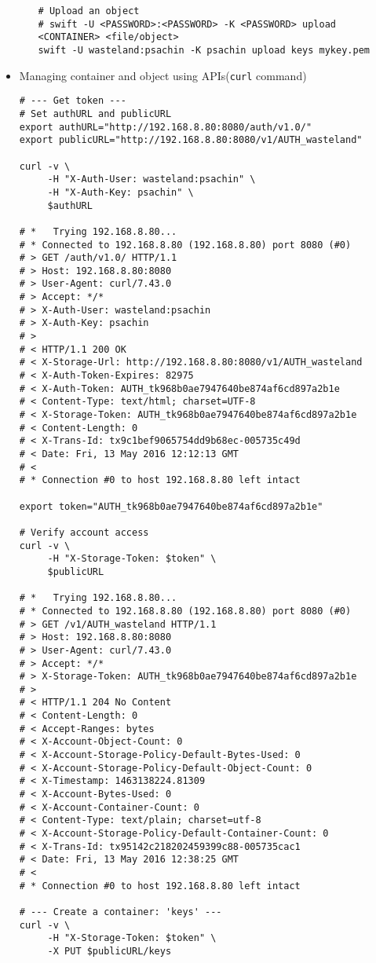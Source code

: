 \documentclass{article}
\begin{document}
\begin{itemize}
\begin{itemize}
\begin{verbatim}
# Upload an object
# swift -U <PASSWORD>:<PASSWORD> -K <PASSWORD> upload <CONTAINER> <file/object>
swift -U wasteland:psachin -K psachin upload keys mykey.pem
\end{verbatim}
\end{itemize}
\item Managing container and object using APIs(\texttt{curl} command)
\begin{verbatim}
# --- Get token ---
# Set authURL and publicURL
export authURL="http://192.168.8.80:8080/auth/v1.0/"
export publicURL="http://192.168.8.80:8080/v1/AUTH_wasteland"

curl -v \
     -H "X-Auth-User: wasteland:psachin" \
     -H "X-Auth-Key: psachin" \
     $authURL

# *   Trying 192.168.8.80...
# * Connected to 192.168.8.80 (192.168.8.80) port 8080 (#0)
# > GET /auth/v1.0/ HTTP/1.1
# > Host: 192.168.8.80:8080
# > User-Agent: curl/7.43.0
# > Accept: */*
# > X-Auth-User: wasteland:psachin
# > X-Auth-Key: psachin
# >
# < HTTP/1.1 200 OK
# < X-Storage-Url: http://192.168.8.80:8080/v1/AUTH_wasteland
# < X-Auth-Token-Expires: 82975
# < X-Auth-Token: AUTH_tk968b0ae7947640be874af6cd897a2b1e
# < Content-Type: text/html; charset=UTF-8
# < X-Storage-Token: AUTH_tk968b0ae7947640be874af6cd897a2b1e
# < Content-Length: 0
# < X-Trans-Id: tx9c1bef9065754dd9b68ec-005735c49d
# < Date: Fri, 13 May 2016 12:12:13 GMT
# <
# * Connection #0 to host 192.168.8.80 left intact

export token="AUTH_tk968b0ae7947640be874af6cd897a2b1e"

# Verify account access
curl -v \
     -H "X-Storage-Token: $token" \
     $publicURL

# *   Trying 192.168.8.80...
# * Connected to 192.168.8.80 (192.168.8.80) port 8080 (#0)
# > GET /v1/AUTH_wasteland HTTP/1.1
# > Host: 192.168.8.80:8080
# > User-Agent: curl/7.43.0
# > Accept: */*
# > X-Storage-Token: AUTH_tk968b0ae7947640be874af6cd897a2b1e
# >
# < HTTP/1.1 204 No Content
# < Content-Length: 0
# < Accept-Ranges: bytes
# < X-Account-Object-Count: 0
# < X-Account-Storage-Policy-Default-Bytes-Used: 0
# < X-Account-Storage-Policy-Default-Object-Count: 0
# < X-Timestamp: 1463138224.81309
# < X-Account-Bytes-Used: 0
# < X-Account-Container-Count: 0
# < Content-Type: text/plain; charset=utf-8
# < X-Account-Storage-Policy-Default-Container-Count: 0
# < X-Trans-Id: tx95142c218202459399c88-005735cac1
# < Date: Fri, 13 May 2016 12:38:25 GMT
# <
# * Connection #0 to host 192.168.8.80 left intact

# --- Create a container: 'keys' ---
curl -v \
     -H "X-Storage-Token: $token" \
     -X PUT $publicURL/keys


\end{verbatim}
\end{itemize}
\end{document}
